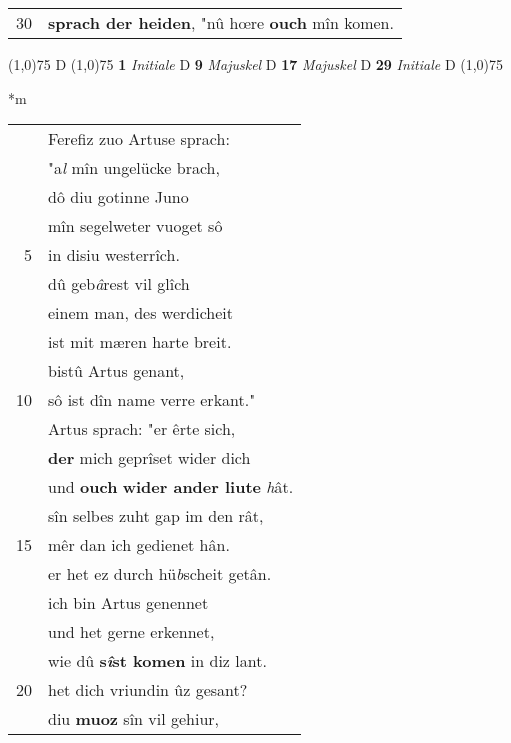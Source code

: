 \documentclass[8pt,a4paper,notitlepage]{article}
\begin{document}
\begin{table}[ht]
\begin{minipage}[t]{0.5\linewidth}
\begin{tabular}{rl}
30 & \textbf{sprach der heiden}, "nû hœre \textbf{ouch} mîn komen.\\ 
\end{tabular}
\scriptsize
\line(1,0){75} \newline
D \newline
\line(1,0){75} \newline
\textbf{1} \textit{Initiale} D  \textbf{9} \textit{Majuskel} D  \textbf{17} \textit{Majuskel} D  \textbf{29} \textit{Initiale} D  \newline
\line(1,0){75} \newline
\newline
\end{minipage}
\hspace{0.5cm}
\begin{minipage}[t]{0.5\linewidth}
\small
\begin{center}*m
\end{center}
\begin{tabular}{rl}
 & Ferefiz zuo Artuse sprach:\\ 
 & "a\textit{l} mîn ungelücke brach,\\ 
 & dô diu gotinne Juno\\ 
 & mîn segelweter vuoget sô\\ 
5 & in disiu westerrîch.\\ 
 & dû geb\textit{â}rest vil glîch\\ 
 & einem man, des werdicheit\\ 
 & ist mit mæren harte breit.\\ 
 & bistû Artus genant,\\ 
10 & sô ist dîn name verre erkant."\\ 
 & Artus sprach: "er êrte sich,\\ 
 & \textbf{der} mich geprîset wider dich\\ 
 & und \textbf{ouch} \textbf{wider ander liute} \textit{h}ât.\\ 
 & sîn selbes zuht gap im den rât,\\ 
15 & mêr dan ich gedienet hân.\\ 
 & er het ez durch hü\textit{b}scheit getân.\\ 
 & ich bin Artus genennet\\ 
 & und het gerne erkennet,\\ 
 & wie dû \textbf{s\textit{î}st komen} in diz lant.\\ 
20 & het dich vriundin ûz gesant?\\ 
 & diu \textbf{muoz} sîn vil gehiur,\\ 

\end{tabular}
\end{minipage}
\end{table}
\end{document}
